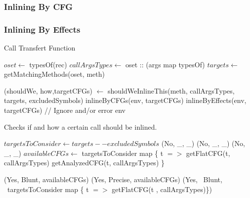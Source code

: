 \documentclass[a4paper]{article}
\begin{document}
\subsubsection{Inlining By CFG}

\subsubsection{Inlining By Effects}


\begin{algorithm}
\caption{Call Transfert Function}\label{algo:pt:methcall}
\begin{algorithmic}[1]
    \State $oset \gets$ typesOf(rec)
    \State $callArgsTypes \gets$ oset :: (args map typesOf)
    \State $targets \gets$ getMatchingMethods(oset, meth)

    \State (shouldWe, how,targetCFGs) $\gets$ shouldWeInlineThis(meth, callArgsTypes, targets, excludedSymbols)
            \State \Return inlineByCFGs(env, targetCFGs)
        \Else
            \State \Return inlineByEffects(env, targetCFGs)
        \EndIf
    \Else
        \State // Ignore and/or error
        \State \Return env
    \EndIf
\EndFunction
\end{algorithmic}
\end{algorithm}

\begin{algorithm}
\caption{Checks if and how a certain call should be inlined.}\label{algo:pt:shouldwe}
\begin{algorithmic}[1]
    \State $targetsToConsider \gets targets -- excludedSymbols$
            \State \Return (No, \_, \_)
            \State \Return (No, \_, \_)
            \State \Return (No, \_, \_)
        \Else
            \State $availableCFGs \gets$ targetsToConsider map \{ t $=>$
                \State getFlatCFG(t, callArgsTypes)
            \Else
                \State getAnalyzedCFG(t, callArgsTypes)
            \EndIf
            \State \}

                \State \Return (Yes, Blunt, availableCFGs)
            \Else
                \State \Return (Yes, Precise, availableCFGs)
            \EndIf
        \EndIf
    \Else
        \State \Return (Yes, ~Blunt, ~targetsToConsider map \{ t $=>$ getFlatCFG(t , callArgsTypes)\})
    \EndIf
\EndFunction
\end{algorithmic}
\end{algorithm}
\end{document}
